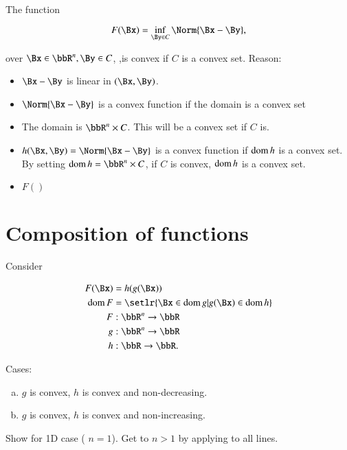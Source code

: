 The function

\begin{equation}\label{eqn:convexOptimizationLecture8:140}
F(\Bx) = \inf_{\By \in C} \Norm{ \Bx - \By },
\end{equation}

over \( \Bx \in \bbR^n, \By \in C \), ,is convex if \( C \) is a convex set.  Reason:

\begin{itemize}
\item \( \Bx - \By \) is linear in \((\Bx, \By)\).
\item \( \Norm{ \Bx - \By } \) is a convex function if the domain is a convex set
\item The domain is \( \bbR^n \times C \).  This will be a convex set if \( C \) is.
\item \( h(\Bx, \By) = \Norm{\Bx -\By} \) is a convex function if \( \operatorname{dom} h \) is a convex set.  By setting \( \dom h = \bbR^n \times C \), if \( C \) is convex, \( \operatorname{dom} h \) is a convex set.
\item \( F() \)
\end{itemize}

\section{Composition of functions}

Consider

\begin{equation}\label{eqn:convexOptimizationLecture8:160}
\begin{aligned}
F(\Bx) &= h(g(\Bx)) \\
\dom F &= \setlr{ \Bx \in \dom g | g(\Bx) \in \dom h } \\
F &: \bbR^n \rightarrow \bbR \\
g &: \bbR^n \rightarrow \bbR \\
h &: \bbR \rightarrow \bbR.
\end{aligned}
\end{equation}

Cases:
\begin{enumerate}[(a)]
\item \( g \) is convex, \( h \) is convex and non-decreasing.
\item \( g \) is convex, \( h \) is convex and non-increasing.
\end{enumerate}

Show for 1D case ( \( n = 1 \)).  Get to \( n > 1 \) by applying to all lines.

